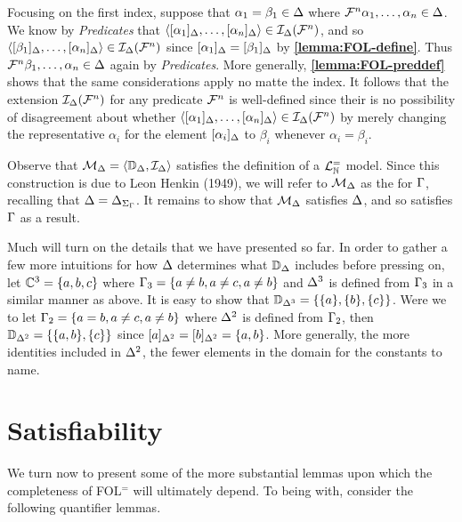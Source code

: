 Focusing on the first index, suppose that $\alpha_1=\beta_1\in\Delta$ where $\mathcal{F}^n\alpha_1,\ldots,\alpha_n\in\Delta$. 
We know by \textit{Predicates} that $\langle[\alpha_1]_{\Delta},\ldots,[\alpha_n]_{\Delta}\rangle\in\mathcal{I}_{\Delta}(\mathcal{F}^n)$, and so $\langle[\beta_1]_{\Delta},\ldots,[\alpha_n]_{\Delta}\rangle\in\mathcal{I}_{\Delta}(\mathcal{F}^n)$ since $[\alpha_1]_{\Delta}=[\beta_1]_{\Delta}$ by \textbf{\ref{lemma:FOL-define}}.
Thus $\mathcal{F}^n\beta_1,\ldots,\alpha_n\in\Delta$ again by \textit{Predicates}. 
More generally, \textbf{\ref{lemma:FOL-preddef}} shows that the same considerations apply no matte the index. 
It follows that the extension $\mathcal{I}_{\Delta}(\mathcal{F}^n)$ for any predicate $\mathcal{F}^n$ is well-defined since their is no possibility of disagreement about whether $\langle[\alpha_1]_{\Delta},\ldots,[\alpha_n]_{\Delta}\rangle\in\mathcal{I}_{\Delta}(\mathcal{F}^n)$ by merely changing the representative $\alpha_i$ for the element $[\alpha_i]_{\Delta}$ to $\beta_i$ whenever $\alpha_i = \beta_i$.

Observe that $\mathcal{M}_{\Delta}=\langle\mathbb{D}_{\Delta},\mathcal{I}_{\Delta}\rangle$ satisfies the definition of a $\mathcal{L}^{=}_{\mathbb{N}}$ model.
Since this construction is due to Leon Henkin (1949), we will refer to $\mathcal{M}_{\Delta}$ as the  for $\Gamma$, recalling that $\Delta=\Delta_{\Sigma_{\Gamma}}$.
It remains to show that $\mathcal{M}_{\Delta}$ satisfies $\Delta$, and so satisfies $\Gamma$ as a result.

Much will turn on the details that we have presented so far. %
In order to gather a few more intuitions for how $\Delta$ determines what $\mathbb{D}_{\Delta}$ includes before pressing on, let $\mathbb{C}^3 = \lbrace a, b, c\rbrace$ where $\Gamma_3 = \lbrace a \neq b, a \neq c, a \neq b\rbrace$ and $\Delta^3$ is defined from $\Gamma_3$ in a similar manner as above.
It is easy to show that $\mathbb{D}_{\Delta^3} = \lbrace\lbrace a\rbrace,\lbrace b\rbrace,\lbrace c\rbrace\rbrace$.
Were we to let $\Gamma_2 = \lbrace a = b, a \neq c, a \neq b\rbrace$ where $\Delta^2$ is defined from $\Gamma_2$, then $\mathbb{D}_{\Delta^2} = \lbrace\lbrace a, b\rbrace,\lbrace c\rbrace\rbrace$ since $[a]_{\Delta^2} = [b]_{\Delta^2} = \lbrace a, b\rbrace$.
More generally, the more identities included in $\Delta^2$, the fewer elements in the domain for the constants to name.






\section{Satisfiability}%
  \label{sec:Satisfiability}

We turn now to present some of the more substantial lemmas upon which the completeness of FOL$^=$ will ultimately depend. 
To being with, consider the following quantifier lemmas.


